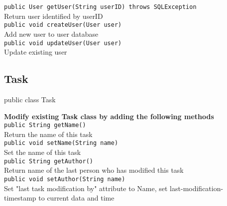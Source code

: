 {\tt 		public User getUser(String userID) throws SQLException} \\
Return user identified by userID\\

{\tt 		public void createUser(User user)} \\
Add new user to user database\\
	
{\tt 		public void updateUser(User user)} \\
Update existing user\\
	
	
	





\subsection{Task}
public class Task

{\bf Modify existing Task class by adding the following methods}\\

{\tt 		public String getName()} \\
Return the name of this task\\
	
{\tt 		public void setName(String name)} \\
Set the name of this task\\
	
{\tt 		public String getAuthor()} \\
Return name of the last person who has modified this task\\

{\tt 		public void setAuthor(String name)} \\
Set "last task modification by" attribute to Name, set last-modification-timestamp to current data and time\\

